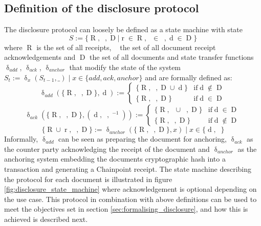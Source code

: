 \documentclass[12pt,msc,a4paper,oneside]{ucl_thesis}
\DeclareMathOperator{\Receipt}{R}
\DeclareMathOperator{\receipt}{r}
\DeclareMathOperator{\party}{p}
\DeclareMathOperator{\Doc}{D}
\DeclareMathOperator{\doc}{d}
\DeclareMathOperator{\docack}{d^*}
\DeclareMathOperator{\Docack}{D^*}
\DeclareMathOperator{\recipient}{r}
\DeclareMathOperator{\statetransferfunc}{\delta}
\DeclareMathOperator{\keydocrecipient}{K_{{\party}_{\recipient}}}
\begin{document}
\subsection{Definition of the disclosure protocol}
The disclosure protocol can loosely be defined as a state machine with state
\begin{equation}
    S := \{\Receipt, \Docack, \Doc | \receipt \in \Receipt, \docack \in \Docack, \doc \in \Doc\}
    \label{eq:disclosure_state_machine}
\end{equation}
where $\Receipt$ is the set of all receipts, $\Docack$ the set of all document receipt acknowledgements and $\Doc$ the set of all documents and state transfer functions $\statetransferfunc_{add}$, $\statetransferfunc_{ack}$, $\statetransferfunc_{anchor}$ that modify the state of the system $S_t := \statetransferfunc_x(S_{t-1}, \_) \mid x \in \{add, ack, anchor\}$ and are formally defined as:
\begin{equation}
    \statetransferfunc_{add}(\{\Receipt, \Docack, \Doc\}, \doc) := \begin{cases}
        \{\Receipt, \Docack, \Doc \cup \doc\} & \textrm{if} \doc \not\in \Doc \\
        \{\Receipt, \Docack, \Doc\} & \textrm{if} \doc \in \Doc
    \end{cases}
    \label{eq:disclosure_state_transfer_add}
\end{equation}
\begin{equation}
    \statetransferfunc_{ack}(\{\Receipt, \Docack, \Doc\}, (\doc, \keydocrecipient, \keydocrecipient^{-1})) := \begin{cases}
        \{\Receipt, \Docack \cup \docack, \Doc\} & \textrm{if} \doc \in \Doc \\
        \{\Receipt, \Docack, \Doc\} & \textrm{if} \doc \not \in \Doc
    \end{cases}
    \label{eq:disclosure_state_transfer_ack}
\end{equation}
\begin{equation}
    \{\Receipt \cup \receipt, \Docack, \Doc\} := \statetransferfunc_{anchor}(\{\Receipt, \Docack, \Doc\}, x) \mid x \in \{\doc, \docack\}
    \label{eq:disclosure_state_transfer_anchor}
\end{equation}
Informally, $\statetransferfunc_{add}$ can be seen as preparing the document for anchoring, $\statetransferfunc_{ack}$ as the counter party acknowledging the receipt of the document and $\statetransferfunc_{anchor}$ as the anchoring system embedding the documents cryptographic hash into a transaction and generating a Chainpoint receipt.
The state machine describing the protocol for each document is illustrated in figure \ref{fig:disclosure_state_machine} where acknowledgement is optional depending on the use case. This protocol in combination with above definitions can be used to meet the objectives set in section \ref{sec:formalising_disclosure}, and how this is achieved is described next.
\end{document}
